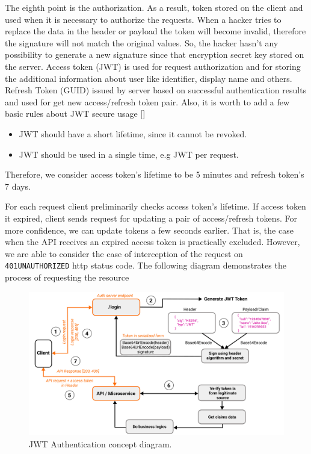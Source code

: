 The eighth point is the authorization.
As a result, token stored on the client and used when it is necessary to authorize the requests.
When a hacker tries to replace the data in the header or payload the token will become invalid,
therefore the signature will not match the original values.
So, the hacker hasn't any possibility to generate a new signature since that encryption secret key stored on the server.
Access token (JWT) is used for request authorization and for storing the additional information about user like identifier,
display name and others.
Refresh Token (GUID) issued by server based on successful authentication results and used for get new access/refresh
token pair.
Also, it is worth to add a few basic rules about JWT secure usage [\cite{RDegges}]
\begin{itemize}
    \item JWT should have a short lifetime, since it cannot be revoked.
    \item JWT should be used in a single time, e.g JWT per request.
\end{itemize}
Therefore, we consider access token's lifetime to be 5 minutes and refresh token's 7 days.

For each request client preliminarily checks access token's lifetime.
If access token it expired, client sends request for updating a pair of access/refresh tokens.
For more confidence, we can update tokens a few seconds earlier.
That is, the case when the API receives an expired access token is practically excluded.
However, we are able to consider the case of interception of the request on \texttt{401UNAUTHORIZED} http status code.
The following diagram demonstrates the process of requesting the resource

\begin{figure}[H]
    \centering
    \includegraphics[width=1\textwidth]{Pictures/jwt_auth_scheme.pdf}
    \caption{JWT Authentication concept diagram.}\label{fig:figure3}
\end{figure}

